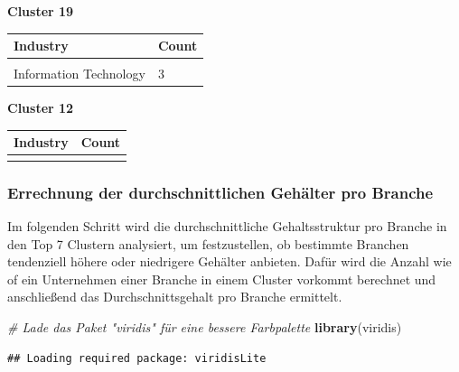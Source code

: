 \documentclass[
]{article}
\newenvironment{Shaded}{\begin{snugshade}}{\end{snugshade}}
\newcommand{\CommentTok}[1]{\textcolor[rgb]{0.56,0.35,0.01}{\textit{#1}}}
\newcommand{\FunctionTok}[1]{\textcolor[rgb]{0.13,0.29,0.53}{\textbf{#1}}}
\newcommand{\NormalTok}[1]{#1}
\begin{document}
\textbf{Cluster 19}

\begin{tabular}{ll}
\toprule
Industry & Count\\
\midrule
\cellcolor{gray!10}{Advertising \& Marketing} & \cellcolor{gray!10}{1}\\
Information Technology & 3\\
\bottomrule
\end{tabular}

\textbf{Cluster 12}

\begin{tabular}{ll}
\toprule
Industry & Count\\
\midrule
\cellcolor{gray!10}{Insurance Carriers} & \cellcolor{gray!10}{2}\\
\bottomrule
\end{tabular}

\subsubsection{Errechnung der durchschnittlichen Gehälter pro
Branche}\label{errechnung-der-durchschnittlichen-gehuxe4lter-pro-branche}

Im folgenden Schritt wird die durchschnittliche Gehaltsstruktur pro
Branche in den Top 7 Clustern analysiert, um festzustellen, ob bestimmte
Branchen tendenziell höhere oder niedrigere Gehälter anbieten. Dafür
wird die Anzahl wie of ein Unternehmen einer Branche in einem Cluster
vorkommt berechnet und anschließend das Durchschnittsgehalt pro Branche
ermittelt.

\begin{Shaded}
\begin{Highlighting}[]
\CommentTok{\# Lade das Paket "viridis" für eine bessere Farbpalette}
\FunctionTok{library}\NormalTok{(viridis)}
\end{Highlighting}
\end{Shaded}

\begin{verbatim}
## Loading required package: viridisLite
\end{verbatim}
\end{document}
